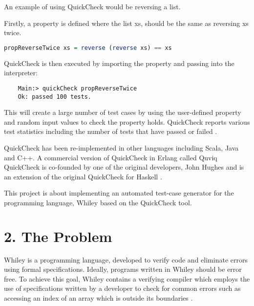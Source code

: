 \documentclass[11pt, a4paper, oneside, openright]{report}
\begin{document}
An example of using QuickCheck would be reversing a list.

Firstly, a property is defined where the list xs, should be the same as reversing xs twice.

\begin{lstlisting}[language=haskell]
	propReverseTwice xs = reverse (reverse xs) == xs
\end{lstlisting}

QuickCheck is then executed by importing the property and passing into the interpreter:

\begin{lstlisting}
	Main:> quickCheck propReverseTwice
	Ok: passed 100 tests.
\end{lstlisting}

This will create a large number of test cases by using the user-defined property and random input values to check the property holds. QuickCheck reports various test statistics including the number of tests that have passed or failed \cite{QClightweight}.

QuickCheck has been re-implemented in other languages including Scala, Java and C++. A commercial version of QuickCheck in Erlang called Quviq QuickCheck is co-founded by one of the original developers, John Hughes and is an extension of the original QuickCheck for Haskell \cite{QCFunProfit}.

This project is about implementing an automated test-case generator for the programming language, Whiley based on the QuickCheck tool. 

%
%
%

\section*{2. The Problem}
Whiley is a programming language, developed to verify code and eliminate errors using formal specifications. 
Ideally, programs written in Whiley should be error free.
To achieve this goal, Whiley contains a verifying compiler which employs the use of specifications written by a developer to check for common errors such as accessing an index of an array which is outside its boundaries \cite{WhileyLang}.
\end{document}
